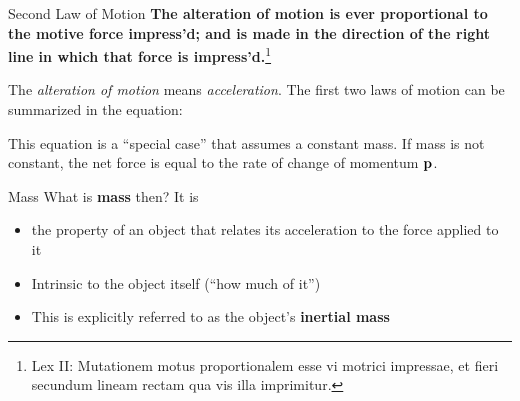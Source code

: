 \documentclass[12pt,compress,aspectratio=169]{beamer}
\newcommand{\mb}[1]{\ensuremath\mathbf{#1}}
\newcommand{\eq}[2]{\vspace{#1}{\Large\begin{displaymath}#2\end{displaymath}}}
\begin{document}
\begin{frame}{Second Law of Motion}
  \textbf{The alteration of motion is ever proportional to the motive force
    impress'd; and is made in the direction of the right line in which that
    force is impress'd.}\footnote{Lex II: Mutationem motus proportionalem esse
    vi motrici impressae, et fieri secundum lineam rectam qua vis illa
    imprimitur.}

  \vspace{.2in}The \emph{alteration of motion} means \emph{acceleration}. The
  first two laws of motion can be summarized in the equation:

  \eq{-.2in}{
    \boxed{\mb{F}_\mathrm{net}=\Sigma\mb{F}=m\mb{a}}
  }

  \vspace{-.15in}\textcolor{red!80!black}{This equation is a ``special case''
    that assumes a constant mass.} If mass is not constant, the net force is
  equal to the rate of change of momentum $\mb{p}$.

  \eq{-.2in}{
    \mb{F}_\mathrm{net}=\frac{d\mb{p}}{dt}
  }
\end{frame}


\begin{frame}{Mass}
  What is \textbf{mass} then? It is
  \begin{itemize}
    \item the property of an object that relates its acceleration to the force
      applied to it
    \item Intrinsic to the object itself (``how much of it'')
    \item This is explicitly referred to as the object's \textbf{inertial mass}
  \end{itemize}
\end{frame}
\end{document}
